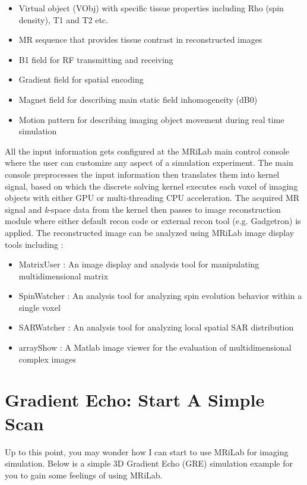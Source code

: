 \documentclass{book}%
\begin{document}
\begin{itemize}
	\item Virtual object (VObj) with specific tissue properties including Rho (spin density), T1 and T2 etc.
	\item MR sequence that provides tissue contrast in reconstructed images 
	\item B1 field for RF transmitting and receiving
	\item Gradient field for spatial encoding
	\item Magnet field for describing main static field inhomogeneity (dB0)
	\item Motion pattern for describing imaging object movement during real time simulation
\end{itemize}

All the input information gets configured at the MRiLab main control console where the user can customize any aspect of a simulation experiment. The main console preprocesses the input information then translates them into kernel signal, based on which the discrete solving kernel executes each voxel of imaging objects with either GPU or multi-threading CPU acceleration. The acquired MR signal and \textit{k}-space data from the kernel then passes to image reconstruction module where either default recon code or external recon tool (e.g. Gadgetron) is applied. The reconstructed image can be analyzed using MRiLab image display tools including :

\begin{itemize}
	\item MatrixUser : An image display and analysis tool for manipulating multidimensional matrix
	\item SpinWatcher : An analysis tool for analyzing spin evolution behavior within a single voxel
	\item SARWatcher : An analysis tool for analyzing local spatial SAR distribution
	\item arrayShow : A Matlab image viewer for the evaluation of multidimensional complex images
\end{itemize}

\section{Gradient Echo: Start A Simple Scan}

Up to this point, you may wonder how I can start to use MRiLab for imaging simulation. Below is a simple 3D Gradient Echo (GRE) simulation example for you to gain some feelings of using MRiLab.
\end{document}
